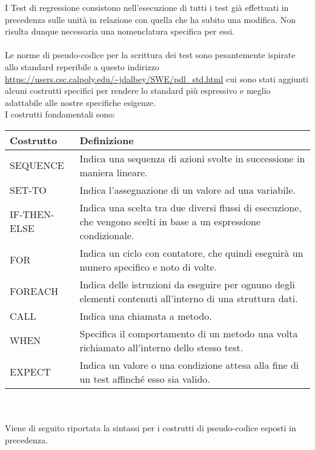             I Test di regressione consistono nell'esecuzione di tutti i test già effettuati in precedenza sulle unità in relazione con quella che ha subito una modifica. Non risulta dunque necessaria una nomenclatura specifica per essi.
            \\\\
            Le norme di pseudo-codice per la scrittura dei test sono pesantemente ispirate allo standard reperibile a questo indirizzo \url{https://users.csc.calpoly.edu/~jdalbey/SWE/pdl_std.html} cui sono stati aggiunti alcuni costrutti specifici per rendere lo standard più espressivo e meglio adattabile alle nostre specifiche esigenze. \\
            I costrutti fondamentali sono: \\
            \begin{table}[h]
                \begin{tabular}{|p{} | p{}|}
                    \hline
                    Costrutto & Definizione \\
                    \hline
                    SEQUENCE & Indica una sequenza di azioni svolte in successione in maniera lineare.\\
                    \hline
                    SET-TO & Indica l'assegnazione di un valore ad una variabile.\\
                    \hline
                    IF-THEN-ELSE & Indica una scelta tra due diversi flussi di esecuzione, che vengono scelti in base a un espressione condizionale.\\
                    \hline
                    FOR & Indica un ciclo con contatore, che quindi eseguirà un numero specifico e noto di volte.\\
                    \hline
                    FOREACH & Indica delle istruzioni da eseguire per ognuno degli elementi contenuti all'interno di una struttura dati.\\
                    \hline
                    CALL & Indica una chiamata a metodo.\\
                    \hline
                    WHEN & Specifica il comportamento di un metodo una volta richiamato all'interno dello stesso test.\\
                    \hline
                    EXPECT & Indica un valore o una condizione attesa alla fine di un test affinché esso sia valido.\\
                    \hline
                \end{tabular}
            \end{table}
            \\\\
            Viene di seguito riportata la sintassi per i costrutti di pseudo-codice esposti in precedenza.

